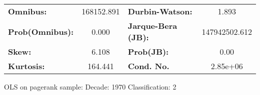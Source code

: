\begin{center}
\begin{tabular}{lccccc}
\bottomrule
\end{tabular}
\begin{tabular}{lclc}
\textbf{Omnibus:}       & 168152.891 & \textbf{  Durbin-Watson:     } &       1.893    \\
\textbf{Prob(Omnibus):} &    0.000   & \textbf{  Jarque-Bera (JB):  } & 147942502.612  \\
\textbf{Skew:}          &    6.108   & \textbf{  Prob(JB):          } &        0.00    \\
\textbf{Kurtosis:}      &  164.441   & \textbf{  Cond. No.          } &    2.85e+06    \\
\bottomrule
\end{tabular}
\end{center}
\break
OLS on pagerank sample: Decade: 1970 Classification: 2
